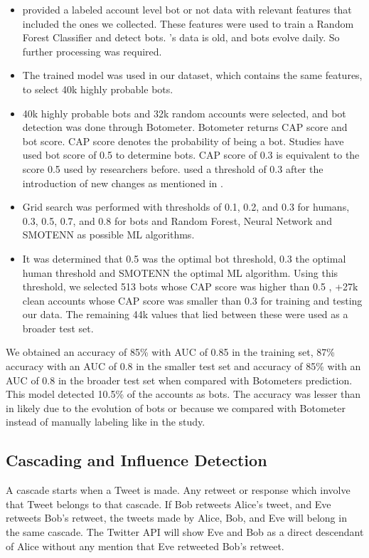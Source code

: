 \documentclass[letterpaper]{article}
\begin{document}
\begin{itemize}
    \item \cite{cresci2017paradigm} provided a labeled account level bot or not data with relevant features that included the ones we collected.
    These features were used to train a Random Forest Classifier and detect bots. 
    \cite{cresci2017paradigm}'s data is old, and bots evolve daily. So further processing was required.
    \item The trained model was used in our dataset, which contains the same features, to select 40k highly probable bots.
    \item 40k highly probable bots and 32k random accounts were selected, and bot detection was done through Botometer. Botometer returns CAP score and bot score. CAP score denotes the probability of being a bot. 
    Studies have used bot score of 0.5 to determine bots. CAP score of 0.3 is equivalent to the score 0.5 used by researchers before. \cite{deb2019perils} used a threshold of 0.3 after the 
    introduction of new changes as mentioned in \cite{yang2019arming}.
    \item Grid search was performed with thresholds of 0.1, 0.2, and 0.3 for humans, 0.3, 0.5, 0.7, and 0.8 for bots and Random Forest, Neural Network and SMOTENN as possible ML algorithms.
    \item It was determined that 0.5 was the optimal bot threshold, 0.3 the optimal human threshold and SMOTENN the optimal ML algorithm. Using this threshold, we selected 513 bots whose CAP score was higher than 0.5 , 
    +27k clean accounts whose CAP score was smaller than 0.3 for training and testing our data. The remaining 44k values that lied between these were used as a broader test set.
\end{itemize}

We obtained an accuracy of 85\% with AUC of 0.85 in the training set, 87\% accuracy with 
an AUC of 0.8 in the smaller test set and accuracy of 85\% with an AUC of 0.8 in the broader test set when compared with Botometers prediction. This model detected 10.5\% of the accounts as 
bots. The accuracy was lesser than in \cite{kudugunta2018deep} likely due to the evolution of bots or because we compared with Botometer instead of manually labeling like in the study. 


\subsection{Cascading and Influence Detection}
A cascade starts when a Tweet is made. Any retweet or response which involve that Tweet belongs to that cascade. If Bob retweets Alice's tweet, and Eve retweets Bob's retweet, the tweets
made by Alice, Bob, and Eve will belong in the same cascade. The Twitter API will show Eve and Bob as a direct descendant of Alice without any mention that Eve retweeted Bob's retweet. \par
\end{document}
